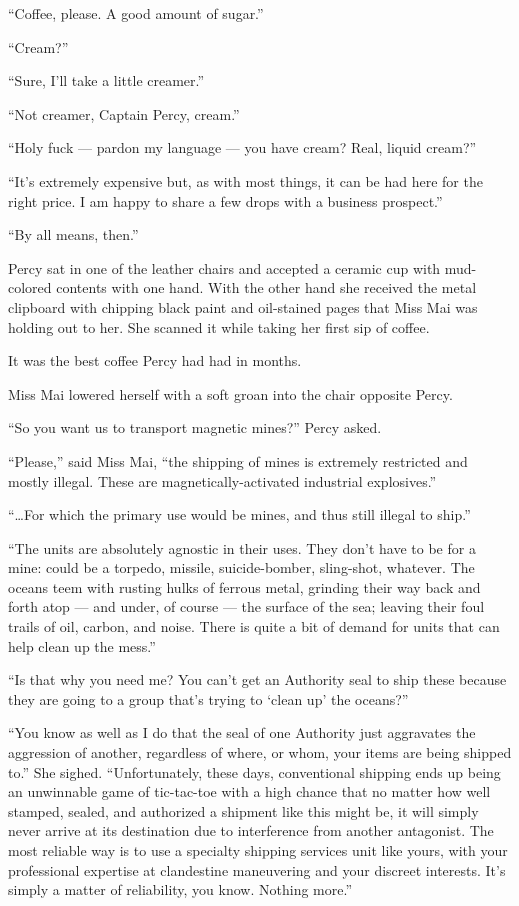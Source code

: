 \documentclass[
]{scrbook}
\begin{document}
``Coffee, please. A good amount of sugar.''

``Cream?''

``Sure, I'll take a little creamer.''

``Not creamer, Captain Percy, cream.''

``Holy fuck --- pardon my language --- you have cream? Real, liquid
cream?''

``It's extremely expensive but, as with most things, it can be had here
for the right price. I am happy to share a few drops with a business
prospect.''

``By all means, then.''

Percy sat in one of the leather chairs and accepted a ceramic cup with
mud-colored contents with one hand. With the other hand she received the
metal clipboard with chipping black paint and oil-stained pages that
Miss Mai was holding out to her. She scanned it while taking her first
sip of coffee.

It was the best coffee Percy had had in months.

Miss Mai lowered herself with a soft groan into the chair opposite
Percy.

``So you want us to transport magnetic mines?'' Percy asked.

``Please,'' said Miss Mai, ``the shipping of mines is extremely
restricted and mostly illegal. These are magnetically-activated
industrial explosives.''

``\ldots For which the primary use would be mines, and thus still
illegal to ship.''

``The units are absolutely agnostic in their uses. They don't have to be
for a mine: could be a torpedo, missile, suicide-bomber, sling-shot,
whatever. The oceans teem with rusting hulks of ferrous metal, grinding
their way back and forth atop --- and under, of course --- the surface
of the sea; leaving their foul trails of oil, carbon, and noise. There
is quite a bit of demand for units that can help clean up the mess.''

``Is that why you need me? You can't get an Authority seal to ship these
because they are going to a group that's trying to `clean up' the
oceans?''

``You know as well as I do that the seal of one Authority just
aggravates the aggression of another, regardless of where, or whom, your
items are being shipped to.'' She sighed. ``Unfortunately, these days,
conventional shipping ends up being an unwinnable game of tic-tac-toe
with a high chance that no matter how well stamped, sealed, and
authorized a shipment like this might be, it will simply never arrive at
its destination due to interference from another antagonist. The most
reliable way is to use a specialty shipping services unit like yours,
with your professional expertise at clandestine maneuvering and your
discreet interests. It's simply a matter of reliability, you know.
Nothing more.''
\end{document}
